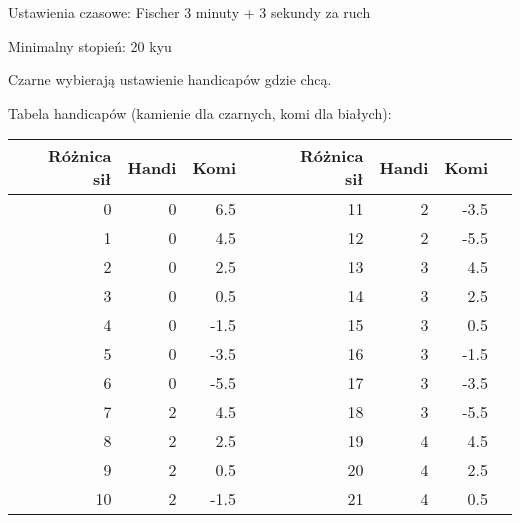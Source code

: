 



Ustawienia czasowe: Fischer 3 minuty + 3 sekundy za ruch

Minimalny stopień: 20 kyu

Czarne wybierają ustawienie handicapów gdzie chcą.

Tabela handicapów (kamienie dla czarnych, komi dla białych):

\bigskip

\setlength{\extrarowheight}{7pt}
\begin{tabularx}{\textwidth}{| X r r r X | X r r r X |}
\hline
& Różnica sił & Handi & Komi & & & Różnica sił & Handi & Komi & \\ \hline
&           0 &     0 &  6.5 & & &          11 &     2 & -3.5 & \\ \hline
&           1 &     0 &  4.5 & & &          12 &     2 & -5.5 & \\ \hline
&           2 &     0 &  2.5 & & &          13 &     3 &  4.5 & \\ \hline
&           3 &     0 &  0.5 & & &          14 &     3 &  2.5 & \\ \hline
&           4 &     0 & -1.5 & & &          15 &     3 &  0.5 & \\ \hline
&           5 &     0 & -3.5 & & &          16 &     3 & -1.5 & \\ \hline
&           6 &     0 & -5.5 & & &          17 &     3 & -3.5 & \\ \hline
&           7 &     2 &  4.5 & & &          18 &     3 & -5.5 & \\ \hline
&           8 &     2 &  2.5 & & &          19 &     4 &  4.5 & \\ \hline
&           9 &     2 &  0.5 & & &          20 &     4 &  2.5 & \\ \hline
&          10 &     2 & -1.5 & & &          21 &     4 &  0.5 & \\ \hline
\end{tabularx}


